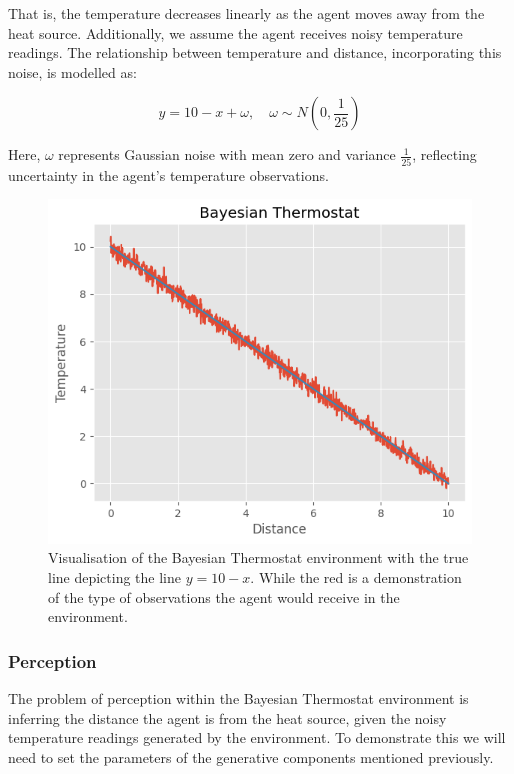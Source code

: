 \documentclass{article}
\begin{document}
That is, the temperature decreases linearly as the agent moves away from the heat source. Additionally, we assume the agent receives noisy temperature readings. The relationship between temperature and distance, incorporating this noise, is modelled as:

\begin{equation}
	y = 10 - x + \omega, \quad \omega \sim N(0, \frac{1}{25})
\end{equation}

Here, $\omega$ represents Gaussian noise with mean zero and variance $\frac{1}{25}$, reflecting uncertainty in the agent's temperature observations.

\begin{figure}[htbp]
    \centering
    \includegraphics[scale=0.55]{images/bayesian_theromostat.png}
    \caption{Visualisation of the Bayesian Thermostat environment with the true line depicting the line $y = 10 - x$. While the red is a demonstration of the type of observations the agent would receive in the environment.}
    \label{fig:bayesian_thermostat}
\end{figure}

\subsubsection{Perception}

The problem of perception within the Bayesian Thermostat environment is inferring the distance the agent is from the heat source, given the noisy temperature readings generated by the environment. To demonstrate this we will need to set the parameters of the generative components mentioned previously.
\end{document}
